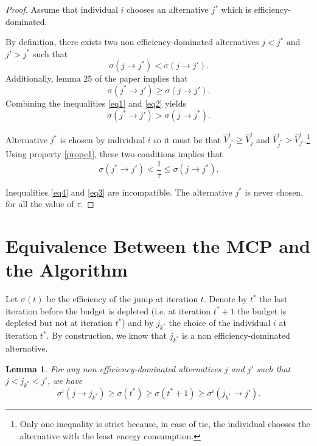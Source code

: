 \documentclass[empty, english]{javaudin}
\newtheorem{lem}{Lemma}
\begin{document}
\begin{proof}
	Assume that individual $i$ chooses an alternative $j^{*}$ which is efficiency-dominated.

	By definition, there exists two non efficiency-dominated alternatives $j < j^{*}$ and $j' > j^{*}$ such that 
\begin{equation}
	\sigma(j \rightarrow j^{*}) < \sigma(j \rightarrow j').
	\label{eq1}
\end{equation}
Additionally, lemma 25 of the paper implies that
\begin{equation}
	\sigma(j^{*} \rightarrow j') \geq \sigma(j \rightarrow j'). 
	\label{eq2}
\end{equation}
Combining the inequalities \eqref{eq1} and \eqref{eq2} yields
\begin{equation}
	\sigma(j^{*} \rightarrow j') > \sigma(j \rightarrow j^{*}). 
	\label{eq4}
\end{equation}

Alternative $j^{*}$ is chosen by individual $i$ so it must be that $\hat{V}^i_{j^{*}} \geq \hat{V}^i_{j}$ and $\hat{V}^i_{j^{*}} > \hat{V}^i_{j'}$.\footnote{Only one inequality is strict because, in case of tie, the individual chooses the alternative with the least energy consumption.}
Using property \ref{prope1}, these two conditions implies that
\begin{equation}
	\sigma(j^{*} \rightarrow j') < \frac{1}{\tau} \leq \sigma(j \rightarrow j^{*}).
	\label{eq3}
\end{equation}

Inequalities \eqref{eq4} and \eqref{eq3} are incompatible. 
The alternative $j^{*}$ is never chosen, for all the value of $\tau$.
\end{proof}

\section{Equivalence Between the MCP and the Algorithm}
\label{sec:Equivalence Between the MCP and the Algorithm}


Let $\sigma(t)$ be the efficiency of the jump at iteration $t$.
Denote by $t^{*}$ the last iteration before the budget is depleted (i.e. at iteration $t^{*}+1$ the budget is depleted but not at iteration $t^{*}$) and by $j_{k^{*}}$ the choice of the individual $i$ at iteration $t^{*}$. 
By construction, we know that $j_{k^{*}}$ is a non efficiency-dominated alternative.

\begin{lem}
	For any non efficiency-dominated alternatives $j$ and $j'$ such that $j < j_{k^{*}} < j'$, we have
	\begin{equation}
		\sigma^i(j \rightarrow j_{k^{*}}) \geq \sigma(t^{*}) \geq \sigma(t^{*} + 1) \geq \sigma^i(j_{k^{*}} \rightarrow j').
		\label{eqlem}
	\end{equation}
	\label{lem1}
\end{lem}
\end{document}
